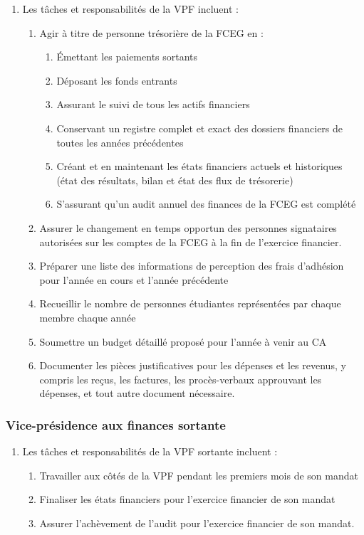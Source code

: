 \begin{enumerate}
 \item Les tâches et responsabilités de la VPF incluent :
  \begin{enumerate}
   \item Agir à titre de personne trésorière de la FCEG en :
    \begin{enumerate}
     \item Émettant les paiements sortants
     \item Déposant les fonds entrants
     \item Assurant le suivi de tous les actifs financiers
     \item Conservant un registre complet et exact des dossiers financiers de toutes les années précédentes
     \item Créant et en maintenant les états financiers actuels et historiques (état des résultats, bilan et état des flux de trésorerie)
     \item S'assurant qu'un audit annuel des finances de la FCEG est complété
    \end{enumerate}
   \item Assurer le changement en temps opportun des personnes signataires autorisées sur les comptes de la FCEG à la fin de l'exercice financier.
   \item Préparer une liste des informations de perception des frais d'adhésion pour l'année en cours et l'année précédente
   \item Recueillir le nombre de personnes étudiantes représentées par chaque membre chaque année
   \item Soumettre un budget détaillé proposé pour l'année à venir au CA
   \item Documenter les pièces justificatives pour les dépenses et les revenus, y compris les reçus, les factures, les procès-verbaux approuvant les dépenses, et tout autre document nécessaire.
  \end{enumerate}
\end{enumerate}

\setcounter{subsubsection}{1}
\subsubsection{Vice-présidence aux finances sortante}
\label{vice-presidence-aux-finances-vpf-vice-presidence-aux-finances-sortante}

\begin{enumerate}
 \item Les tâches et responsabilités de la VPF sortante incluent :
  \begin{enumerate}
   \item Travailler aux côtés de la VPF pendant les premiers mois de son mandat
   \item Finaliser les états financiers pour l'exercice financier de son mandat
   \item Assurer l'achèvement de l'audit pour l'exercice financier de son mandat.
  \end{enumerate}
\end{enumerate}

